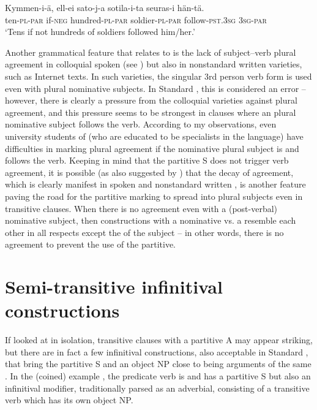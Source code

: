 \documentclass[output=paper]{LSP/langsci}
\begin{document}
\ea\label{15-hu-ex:28}
\gll Kymmen-i-ä, ell-ei sato-j-a sotila-i-ta seuras-i hän-tä.\\
ten-\textsc{pl}-\textsc{par} if-\textsc{neg} hundred-\textsc{pl}-\textsc{par} soldier-\textsc{pl}-\textsc{par} follow-\textsc{pst}.\textsc{3sg} \textsc{3sg}-\textsc{par}\\
\glt ‘Tens if not hundreds of soldiers followed him/her.’
\z

Another grammatical feature that relates to  is the lack of subject–verb plural agreement in colloquial spoken  (see \eg \citealt[67]{Helasvuo2001Syntax}) but also in nonstandard written varieties, such as Internet texts. In such varieties, the singular 3rd person verb form is used even with plural nominative subjects. In Standard , this is considered an error – however, there is clearly a pressure from the colloquial varieties against plural agreement, and this pressure seems to be strongest in clauses where an  plural nominative subject follows the verb. According to my observations, even university students of  (who are educated to be specialists in the language) have difficulties in marking plural agreement if the nominative plural subject is  and follows the verb. Keeping in mind that the partitive S does not trigger verb agreement, it is possible (as also suggested by \citealt{DeSmit2016Fluid}) that the decay of agreement, which is clearly manifest in spoken and nonstandard written , is another feature paving the road for the partitive marking to spread into  plural subjects even in transitive clauses. When there is no agreement even with a (post-verbal) nominative subject, then constructions with a nominative vs. a  resemble each other in all respects except the  of the subject – in other words, there is no agreement to prevent the use of the partitive. 


\section{Semi-transitive infinitival constructions}\label{15-hu-sec:5}

If looked at in isolation, transitive clauses with a partitive A may appear striking, but there are in fact a few infinitival constructions, also acceptable in Standard , that bring the partitive S and an object NP close to being arguments of the same . In the (coined) example , the predicate verb is  and has a partitive S but also an infinitival modifier, traditionally parsed as an adverbial, consisting of a transitive verb which has its own object NP. 
\end{document}
